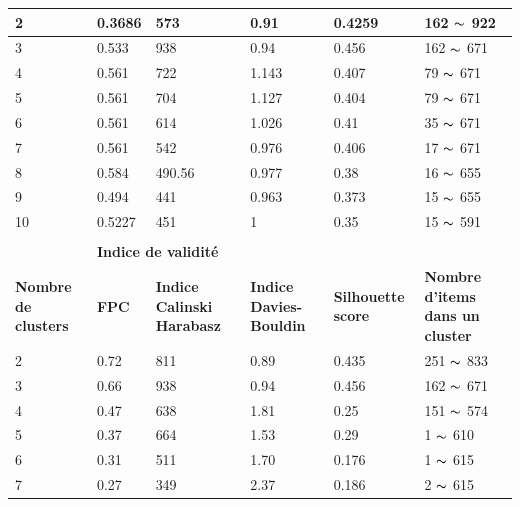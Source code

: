 \begin{table}[H]
\begin{tabular}{|m{2cm}|m{2cm}|m{2cm}|m{2cm}|m{2cm}|m{3cm}|}
	2  & 0.3686 & 573     & \cellcolor{gray!40} 0.91   & 0.4259    &  162  \(\displaystyle \thicksim  \)  922  \\ \hline 	
	3  & 0.533  & \cellcolor{gray!40} 938     & 0.94   & \cellcolor{gray!40} 0.456    &  162  \(\displaystyle \thicksim  \)  671  \\ \hline
	4  & 0.561  & 722     & 1.143  & 0.407    &  79   \(\displaystyle \thicksim  \)  671  \\ \hline
	5  & 0.561  & 704     & 1.127  & 0.404    &  79   \(\displaystyle \thicksim  \)  671  \\ \hline
	6  & 0.561  & 614     & 1.026  & 0.41    &  35   \(\displaystyle \thicksim  \)  671  \\ \hline
	7  & 0.561  & 542     & 0.976  & 0.406   &  17   \(\displaystyle \thicksim  \)  671  \\ \hline
	8  & \cellcolor{gray!40} 0.584  & 490.56  & 0.977  & 0.38   &  16   \(\displaystyle \thicksim  \)  655  \\ \hline
	9  & 0.494  & 441     & 0.963  & 0.373    &  15   \(\displaystyle \thicksim  \)  655  \\ \hline
	10 & 0.5227 & 451     & 1      & 0.35    &  15   \(\displaystyle \thicksim  \)  591  \\ \hline \hline
	\rowcolor{blueforest}
	\multicolumn{6}{|m{16cm}|}{\centering \color{white} \textbf{Fuzzy clustering} } \\ \hline
	&  \multicolumn{4}{|m{8cm}|}{\centering \textbf{Indice de validité} } & \\ \hline
	\textbf{Nombre de clusters}  &   \textbf{FPC} & \textbf{Indice Calinski Harabasz}& \textbf{Indice Davies-Bouldin} & \textbf{Silhouette score}  &  \textbf{Nombre d'items dans un cluster }\\ \hline
	2  & \cellcolor{gray!40} 0.72  & 811  & \cellcolor{gray!40} 0.89   &  0.435    &  251 \(\displaystyle \thicksim  \)  833  \\ \hline 	
	3  & 0.66  & \cellcolor{gray!40} 938  & 0.94   & \cellcolor{gray!40}  0.456    &  162 \(\displaystyle \thicksim  \)  671 \\ \hline
	4  & 0.47  & 638  & 1.81   &  0.25     &  151 \(\displaystyle \thicksim  \)  574 \\ \hline
	5  & 0.37  & 664  & 1.53   &  0.29     &  1   \(\displaystyle \thicksim  \)  610 \\ \hline
	6  & 0.31  & 511  & 1.70   &  0.176    &  1   \(\displaystyle \thicksim  \)  615 \\ \hline
	7  & 0.27  & 349  & 2.37   &  0.186    &  2   \(\displaystyle \thicksim  \)  615 \\ \hline

\end{tabular}
\end{table}
